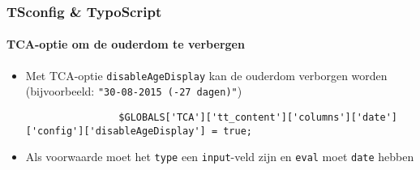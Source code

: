 \begin{frame}[fragile]
	\frametitle{TSconfig \& TypoScript}
	\framesubtitle{TCA-optie om de ouderdom te verbergen}

	\lstset{basicstyle=\tiny\ttfamily}

	\begin{itemize}

		\item Met TCA-optie \texttt{disableAgeDisplay} kan de ouderdom verborgen worden
			\small
				(bijvoorbeeld: \texttt{"30-08-2015 (-27 dagen)"})
			\normalsize

			\begin{lstlisting}
				$GLOBALS['TCA']['tt_content']['columns']['date']['config']['disableAgeDisplay'] = true;
			\end{lstlisting}

		\item Als voorwaarde moet het \texttt{type} een \texttt{input}-veld zijn
			en \texttt{eval} moet \texttt{date} hebben

	\end{itemize}

\end{frame}

